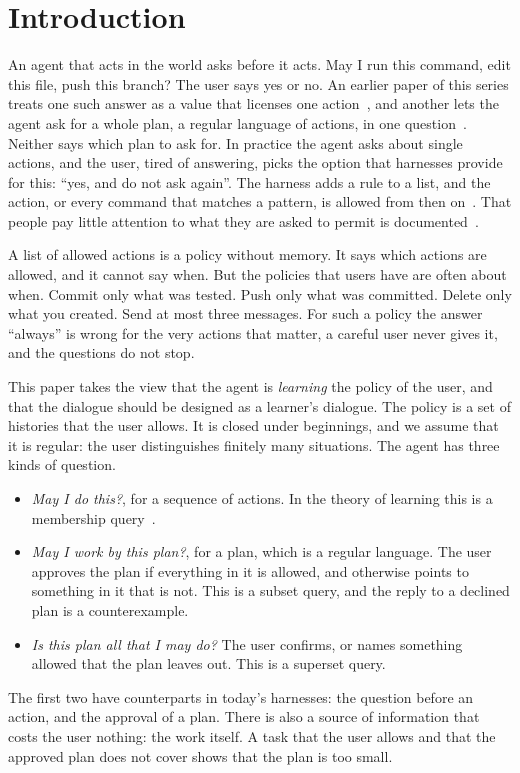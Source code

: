 \documentclass[acmsmall,nonacm,screen]{acmart}
\begin{document}
\authorsaddresses{}

\maketitle

\section{Introduction}

An agent that acts in the world asks before it acts. May I run this command, edit this file,
push this branch? The user says yes or no. An earlier paper of this series treats one such
answer as a value that licenses one action~\cite{tpp4}, and another lets the agent ask for a
whole plan, a regular language of actions, in one question~\cite{tpp11}. Neither says which
plan to ask for. In practice the agent asks about single actions, and the user, tired of
answering, picks the option that harnesses provide for this: ``yes, and do not ask again''.
The harness adds a rule to a list, and the action, or every command that matches a pattern,
is allowed from then on~\cite{claudecodepermissions}. That people pay little attention to
what they are asked to permit is documented~\cite{felt2012}.

A list of allowed actions is a policy without memory. It says which actions are allowed, and
it cannot say when. But the policies that users have are often about when. Commit only what
was tested. Push only what was committed. Delete only what you created. Send at most three
messages. For such a policy the answer ``always'' is wrong for the very actions that matter,
a careful user never gives it, and the questions do not stop.

This paper takes the view that the agent is \emph{learning} the policy of the user, and
that the dialogue should be designed as a learner's dialogue. The policy is a set of
histories that the user allows. It is closed under beginnings, and we assume that it is
regular: the user distinguishes finitely many situations. The agent has three kinds of
question.
\begin{itemize}
\item \emph{May I do this?}, for a sequence of actions. In the theory of learning this is a
  membership query~\cite{angluin1988}.
\item \emph{May I work by this plan?}, for a plan, which is a regular language. The user
  approves the plan if everything in it is allowed, and otherwise points to something in it
  that is not. This is a subset query, and the reply to a declined plan is a counterexample.
\item \emph{Is this plan all that I may do?} The user confirms, or names something allowed
  that the plan leaves out. This is a superset query.
\end{itemize}
The first two have counterparts in today's harnesses: the question before an action, and the
approval of a plan. There is also a source of information that costs the user nothing: the
work itself. A task that the user allows and that the approved plan
does not cover shows that the plan is too small.
\end{document}
